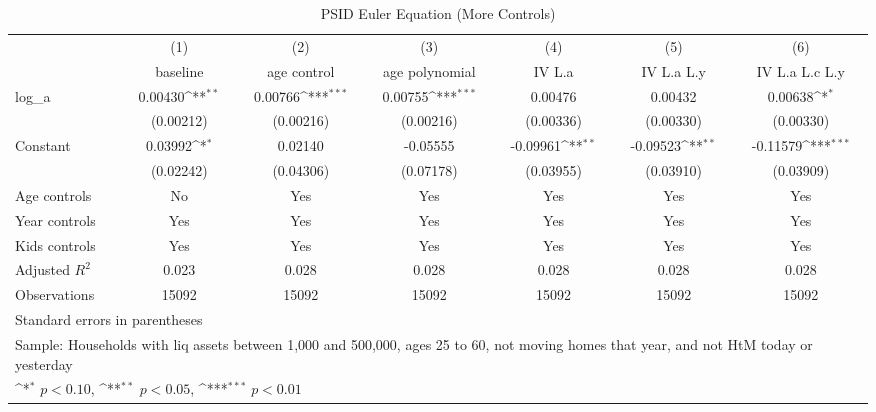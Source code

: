 {
\def\sym#1{\ifmmode^{#1}\else\(^{#1}\)\fi}
\begin{longtable}{l*{6}{c}}
\caption{PSID Euler Equation (More Controls)}\\
\toprule\endfirsthead\midrule\endhead\midrule\endfoot\endlastfoot
                    &\multicolumn{1}{c}{(1)}&\multicolumn{1}{c}{(2)}&\multicolumn{1}{c}{(3)}&\multicolumn{1}{c}{(4)}&\multicolumn{1}{c}{(5)}&\multicolumn{1}{c}{(6)}\\
                    &\multicolumn{1}{c}{baseline}&\multicolumn{1}{c}{age control}&\multicolumn{1}{c}{age polynomial}&\multicolumn{1}{c}{IV L.a}&\multicolumn{1}{c}{IV L.a L.y}&\multicolumn{1}{c}{IV L.a L.c L.y}\\
\midrule
log\_a               &     0.00430\sym{**} &     0.00766\sym{***}&     0.00755\sym{***}&     0.00476         &     0.00432         &     0.00638\sym{*}  \\
                    &   (0.00212)         &   (0.00216)         &   (0.00216)         &   (0.00336)         &   (0.00330)         &   (0.00330)         \\
\addlinespace
Constant            &     0.03992\sym{*}  &     0.02140         &    -0.05555         &    -0.09961\sym{**} &    -0.09523\sym{**} &    -0.11579\sym{***}\\
                    &   (0.02242)         &   (0.04306)         &   (0.07178)         &   (0.03955)         &   (0.03910)         &   (0.03909)         \\
\addlinespace
Age controls        &          No         &         Yes         &         Yes         &         Yes         &         Yes         &         Yes         \\
\addlinespace
Year controls       &         Yes         &         Yes         &         Yes         &         Yes         &         Yes         &         Yes         \\
\addlinespace
Kids controls       &         Yes         &         Yes         &         Yes         &         Yes         &         Yes         &         Yes         \\
\midrule
Adjusted \(R^{2}\)  &       0.023         &       0.028         &       0.028         &       0.028         &       0.028         &       0.028         \\
Observations        &       15092         &       15092         &       15092         &       15092         &       15092         &       15092         \\
\bottomrule
\multicolumn{7}{l}{\footnotesize Standard errors in parentheses}\\
\multicolumn{7}{l}{\footnotesize Sample: Households with liq assets between 1,000 and 500,000, ages 25 to 60, not moving homes that year, and not HtM today or yesterday}\\
\multicolumn{7}{l}{\footnotesize \sym{*} \(p<0.10\), \sym{**} \(p<0.05\), \sym{***} \(p<0.01\)}\\
\end{longtable}
}
